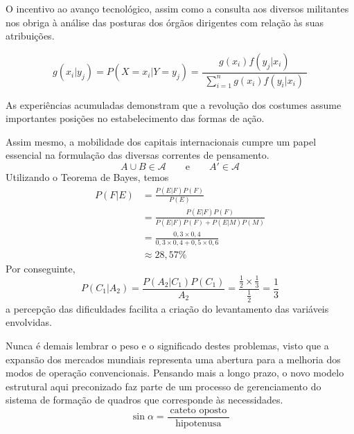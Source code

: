 \begin{apendicesenv}
    O incentivo ao avanço tecnológico, assim como a consulta aos diversos militantes nos obriga
    à análise das posturas dos órgãos dirigentes com relação às suas atribuições.

    \[
        g(x_i|y_j) = P(X=x_i|Y=y_j) = \frac{g(x_i) f(y_j|x_i)}{\displaystyle\;\sum_{i=1}^{n} g(x_i) f(y_i|x_i)\;}
    \]

    As experiências acumuladas demonstram que a revolução dos costumes
    assume importantes posições no estabelecimento das formas de ação.

    Assim mesmo, a mobilidade dos capitais internacionais cumpre um papel essencial
    na formulação das diversas correntes de pensamento.
    \[ A\cup B \in \mathcal{A} \qquad  \text{e} \qquad  A'\in \mathcal{A} \]
    Utilizando o Teorema de Bayes, temos
    \begin{align*}
        P(F|E) & = \frac{P(E|F)P(F)}{P(E)}                                \\[3mm]
               & = \frac{P(E|F)P(F)}{P(E|F)P(F) + P(E|M)P(M)}             \\[3mm]
               & = \frac{0,3 \times 0,4}{0,3 \times 0,4 + 0,5 \times 0,6} \\[3mm]
               & \approx 28,57\%
    \end{align*}
    Por conseguinte,
    \[
        P(C_{1}|A_{2}) = \frac{P(A_{2}|C_{1})P(C_{1})}{A_{2}}
        = \frac{\frac{1}{2} \times \frac{1}{3}}{\frac{1}{2}}
        = \frac{1}{3}
    \]
    a percepção das dificuldades facilita a criação do levantamento
    das variáveis envolvidas.

    Nunca é demais lembrar o peso e o significado destes
    problemas, visto que a expansão dos mercados mundiais representa uma abertura
    para a melhoria dos modos de operação convencionais. Pensando mais a longo
    prazo, o novo modelo estrutural aqui preconizado faz parte de um processo de
    gerenciamento do sistema de formação de quadros que corresponde às necessidades.
    \[
        \sin \alpha = \frac{\;\text{cateto oposto}\;}{\text{hipotenusa}}
    \]


\end{apendicesenv}
